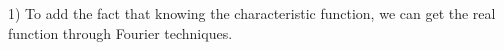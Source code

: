 


1) To add the fact that knowing the characteristic function, we can get the real function through Fourier techniques.